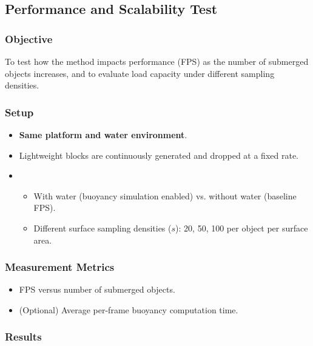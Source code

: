 \subsection*{Performance and Scalability Test}

\subsubsection*{Objective}
To test how the method impacts performance (FPS) as the number of submerged objects increases, and to evaluate load capacity under different sampling densities.

\subsubsection*{Setup}
\begin{itemize}
		\item \textbf{Same platform and water environment}.
		\item {} Lightweight blocks are continuously generated and dropped at a fixed rate.
		\item {}
		\begin{itemize}
				\item With water (buoyancy simulation enabled) vs. without water (baseline FPS).
				\item Different surface sampling densities ($s$): 20, 50, 100 per object per surface area.
		\end{itemize}
\end{itemize}

\subsubsection*{Measurement Metrics}
\begin{itemize}
		\item FPS versus number of submerged objects.
		\item (Optional) Average per-frame buoyancy computation time.
\end{itemize}

\subsubsection*{Results}

